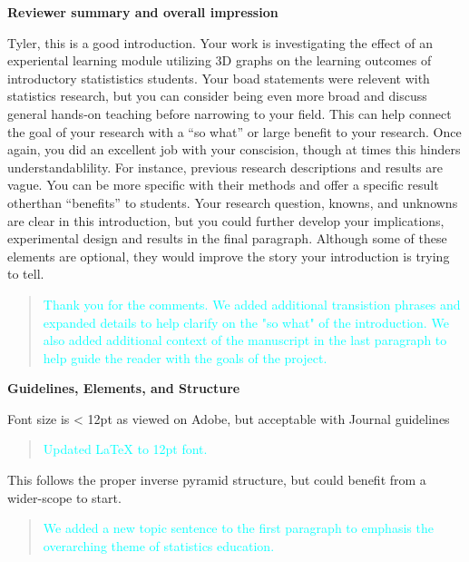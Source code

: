 \documentclass[
  12pt,
  letterpaper,
  DIV=11,
  numbers=noendperiod]{scrartcl}
\begin{document}
\textbf{Reviewer summary and overall impression}

Tyler, this is a good introduction. Your work is investigating the
effect of an experiental learning module utilizing 3D graphs on the
learning outcomes of introductory statististics students. Your boad
statements were relevent with statistics research, but you can consider
being even more broad and discuss general hands-on teaching before
narrowing to your field. This can help connect the goal of your research
with a ``so what'' or large benefit to your research. Once again, you
did an excellent job with your conscision, though at times this hinders
understandablility. For instance, previous research descriptions and
results are vague. You can be more specific with their methods and offer
a specific result otherthan ``benefits'' to students. Your research
question, knowns, and unknowns are clear in this introduction, but you
could further develop your implications, experimental design and results
in the final paragraph. Although some of these elements are optional,
they would improve the story your introduction is trying to tell.

\begin{quote}
\textcolor{cyan}{Thank you for the comments. We added additional transistion phrases and expanded details to help clarify on the "so what" of the introduction. We also added additional context of the manuscript in the last paragraph to help guide the reader with the goals of the project.}
\end{quote}

\begin{quote}
\textcolor{cyan}{}
\end{quote}

\textbf{Guidelines, Elements, and Structure}

Font size is \textless{} 12pt as viewed on Adobe, but acceptable with
Journal guidelines

\begin{quote}
\textcolor{cyan}{Updated LaTeX to 12pt font.}
\end{quote}

This follows the proper inverse pyramid structure, but could benefit
from a wider-scope to start.

\begin{quote}
\textcolor{cyan}{We added a new topic sentence to the first paragraph to emphasis the overarching theme of statistics education.}
\end{quote}
\end{document}
